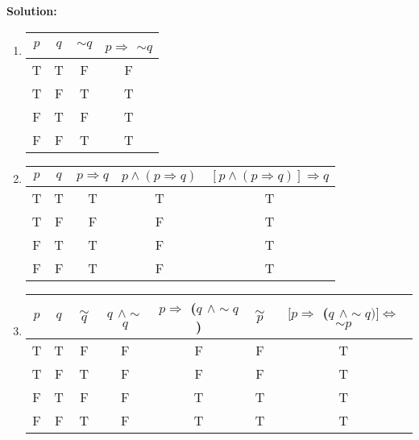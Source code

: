 \begin{enumerate}
      \textbf{Solution:}

      \begin{enumerate}
         \item \mbox{}
            \begin{center}
               \begin{tabular}{@{}|c|c|c|c|@{}} 
                  \hline $p$ & $q$ & $\sim$$q$ &
                  $p \Rightarrow$ $\sim$$q$\\ \hline
                  T & T & F & F\\
                  T & F & T & T\\
                  F & T & F & T\\
                  F & F & T & T\\ \hline
               \end{tabular}
            \end{center}
         \item \mbox{}
            \begin{center}
               \begin{tabular}{@{}|c|c|c|c|c|@{}} 
                  \hline $p$ & $q$ & $p \Rightarrow q$ &
                  $p \land (p \Rightarrow q)$ &
                  $[p \land (p \Rightarrow q)] \Rightarrow q$\\ \hline
                  T & T & T & T & T\\
                  T & F & F & F & T\\
                  F & T & T & F & T\\
                  F & F & T & F & T\\ \hline
               \end{tabular}
            \end{center}
         \item \mbox{}
            \begin{center}
               \begin{tabular}{@{}|c|c|c|c|c|c|c|@{}} 
                  \hline $p$ & $q$ & $\sim$$q$ & $q$ $\land \sim$$q$ &
                  $p \Rightarrow$ ($q$ $\land \sim$$q$) &
                  $\sim$$p$ &
                  $[p \Rightarrow$ ($q$ $\land \sim$$q)] \Leftrightarrow$
                  $\sim$$p$\\ \hline
                  T & T & F & F & F & F & T\\
                  T & F & T & F & F & F & T\\
                  F & T & F & F & T & T & T\\
                  F & F & T & F & T & T & T\\ \hline
               \end{tabular}
            \end{center}
      \end{enumerate}


\end{enumerate}
